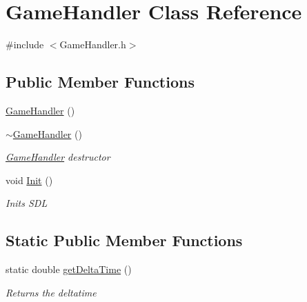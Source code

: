 \hypertarget{class_game_handler}{}\section{Game\+Handler Class Reference}
\label{class_game_handler}


{\ttfamily \#include $<$Game\+Handler.\+h$>$}

\subsection*{Public Member Functions}
\begin{DoxyCompactItemize}
\item 
\mbox{\hyperlink{class_game_handler_ad016ced8da1d660009e014a9aeb833da}{Game\+Handler}} ()
\item 
\mbox{\hyperlink{class_game_handler_a37e9acdced835f48a2bb2a00cb322635}{$\sim$\+Game\+Handler}} ()
\begin{DoxyCompactList}\small\item\em \mbox{\hyperlink{class_game_handler}{Game\+Handler}} destructor \end{DoxyCompactList}\item 
void \mbox{\hyperlink{class_game_handler_aba984ea50d3ce52070950c5aa24e0d7f}{Init}} ()
\begin{DoxyCompactList}\small\item\em Inits S\+DL \end{DoxyCompactList}\end{DoxyCompactItemize}
\subsection*{Static Public Member Functions}
\begin{DoxyCompactItemize}
\item 
static double \mbox{\hyperlink{class_game_handler_aebe798f7fee6c05c05bec6540f240238}{get\+Delta\+Time}} ()
\begin{DoxyCompactList}\small\item\em Returns the deltatime \end{DoxyCompactList}\end{DoxyCompactItemize}
